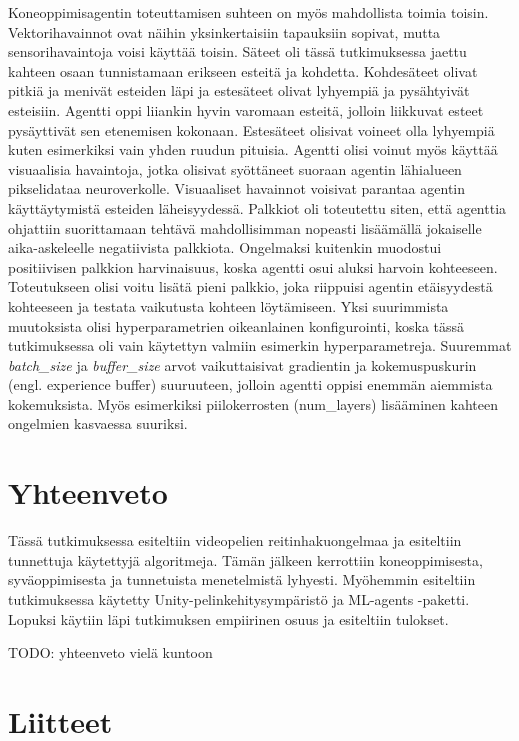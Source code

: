 \documentclass[utf8]{gradu3}
\begin{document}
Koneoppimisagentin toteuttamisen suhteen on myös mahdollista toimia toisin. Vektorihavainnot ovat näihin yksinkertaisiin tapauksiin sopivat, mutta sensorihavaintoja voisi käyttää toisin. Säteet oli tässä tutkimuksessa jaettu kahteen osaan tunnistamaan erikseen esteitä ja kohdetta. Kohdesäteet olivat pitkiä ja menivät esteiden läpi ja estesäteet olivat lyhyempiä ja pysähtyivät esteisiin. Agentti oppi liiankin hyvin varomaan esteitä, jolloin liikkuvat esteet pysäyttivät sen etenemisen kokonaan. Estesäteet olisivat voineet olla lyhyempiä kuten esimerkiksi vain yhden ruudun pituisia. Agentti olisi voinut myös käyttää visuaalisia havaintoja, jotka olisivat syöttäneet suoraan agentin lähialueen pikselidataa neuroverkolle. Visuaaliset havainnot voisivat parantaa agentin käyttäytymistä esteiden läheisyydessä. Palkkiot oli toteutettu siten, että agenttia ohjattiin suorittamaan tehtävä mahdollisimman nopeasti lisäämällä jokaiselle aika-askeleelle negatiivista palkkiota. Ongelmaksi kuitenkin muodostui positiivisen palkkion harvinaisuus, koska agentti osui aluksi harvoin kohteeseen. Toteutukseen olisi voitu lisätä pieni palkkio, joka riippuisi agentin etäisyydestä kohteeseen ja testata vaikutusta kohteen löytämiseen. Yksi suurimmista muutoksista olisi hyperparametrien oikeanlainen konfigurointi, koska tässä tutkimuksessa oli vain käytettyn valmiin esimerkin hyperparametreja. Suuremmat \textit{batch\_size} ja \textit{buffer\_size} arvot vaikuttaisivat gradientin ja kokemuspuskurin (engl. experience buffer) suuruuteen, jolloin agentti oppisi enemmän aiemmista kokemuksista. Myös esimerkiksi piilokerrosten (num\_layers) lisääminen kahteen ongelmien kasvaessa suuriksi.

\chapter{Yhteenveto}
\label{yhteenveto}

Tässä tutkimuksessa esiteltiin videopelien reitinhakuongelmaa ja esiteltiin tunnettuja käytettyjä algoritmeja. Tämän jälkeen kerrottiin koneoppimisesta, syväoppimisesta ja tunnetuista menetelmistä lyhyesti. Myöhemmin esiteltiin tutkimuksessa käytetty Unity-pelinkehitysympäristö ja ML-agents -paketti. Lopuksi käytiin läpi tutkimuksen empiirinen osuus ja esiteltiin tulokset.

TODO: yhteenveto vielä kuntoon

\printbibliography

\chapter{Liitteet}
\label{liitteet}
\end{document}
